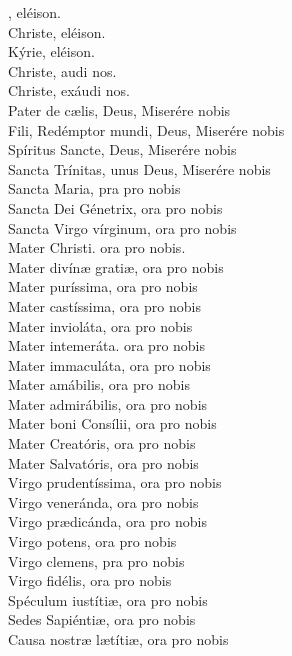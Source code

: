 \documentclass[9pt]{article}
\begin{document}
\begin{multicols*}{2}
    , eléison.\\
    Christe, eléison.\\
    Kýrie, eléison.\\
    Christe, audi nos.\\
    Christe, exáudi nos.\\
    Pater de c{\ae}lis, Deus, Miserére nobis\\
    Fili, Redémptor mundi, Deus, Miserére nobis\\
    Spíritus Sancte, Deus, Miserére nobis\\
    Sancta Trínitas, unus Deus, Miserére nobis\\
    Sancta Maria, pra pro nobis\\
    Sancta Dei Génetrix, ora pro nobis\\
    Sancta Virgo vírginum, ora pro nobis\\
    Mater Christi. ora pro nobis.\\
    Mater divín{\ae} grati{\ae}, ora pro nobis\\
    Mater puríssima, ora pro nobis\\
    Mater castíssima, ora pro nobis\\
    Mater invioláta, ora pro nobis\\
    Mater intemeráta. ora pro nobis\\
    Mater immaculáta, ora pro nobis\\
    Mater amábilis, ora pro nobis\\
    Mater admirábilis, ora pro nobis\\
    Mater boni Consílii, ora pro nobis\\
    Mater Creatóris, ora pro nobis\\
    Mater Salvatóris, ora pro nobis\\
    Virgo prudentíssima, ora pro nobis\\
    Virgo veneránda, ora pro nobis\\
    Virgo pr{\ae}dicánda, ora pro nobis\\
    Virgo potens, ora pro nobis\\
    Virgo clemens, pra pro nobis\\
    Virgo fidélis, ora pro nobis\\
    Spéculum iustíti{\ae}, ora pro nobis\\
    Sedes Sapiénti{\ae}, ora pro nobis\\
    Causa nostr{\ae} l{\ae}títi{\ae}, ora pro nobis\\

\end{multicols*}
\end{document}
